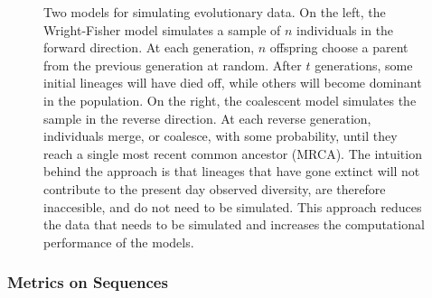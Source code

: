 \begin{figure}
\centering
    \caption[Two models for simulating evolutionary data]{Two models for simulating evolutionary data. On the left, the Wright-Fisher model simulates a sample of $n$ individuals in the forward direction. At each generation, $n$ offspring choose a parent from the previous generation at random. After $t$ generations, some initial lineages will have died off, while others will become dominant in the population. On the right, the coalescent model simulates the sample in the reverse direction. At each reverse generation, individuals merge, or coalesce, with some probability, until they reach a single most recent common ancestor (MRCA). The intuition behind the approach is that lineages that have gone extinct will not contribute to the present day observed diversity, are therefore inaccesible, and do not need to be simulated. This approach reduces the data that needs to be simulated and increases the computational performance of the models.}
\end{figure}

\subsubsection{Metrics on Sequences}
\label{bg:bio:models:metrics}

